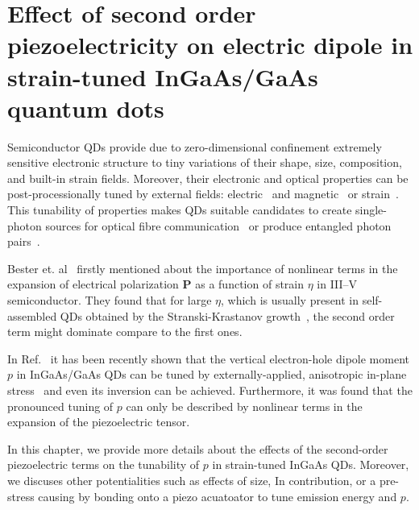 
\chapter{Effect of second order piezoelectricity on electric dipole in strain-tuned InGaAs/GaAs quantum dots}\label{chap:2order_piezo}

Semiconductor QDs provide due to zero-dimensional confinement extremely sensitive electronic structure to tiny variations of their shape, size, composition, and built-in strain fields. %
%
%
Moreover, their electronic and optical properties can be post-processionally tuned by external fields: electric~\cite{Gerardot_2007, Vogel_2007} and magnetic~\cite{Stevenson_2006} or strain~\citep{kleDresden}. This tunability of properties makes QDs suitable candidates to create single-photon sources for optical fibre communication~\cite{Huffaker1998} or produce entangled photon pairs~\cite{Trotta:16}.

Bester et. al~\citep{Bester:06, Bester:06_2} firstly mentioned about the importance of nonlinear terms in the expansion of electrical polarization $\mathbf{P}$ as a function of strain $\eta$ in III--V semiconductor. They found that for large $\eta$, which is usually present in self-assembled QDs obtained by the Stranski-Krastanov growth~\cite{Grundmann}, the second order term might dominate compare to the first ones.

In Ref.~\cite{Aberl:17} it has been recently shown that the vertical electron-hole dipole moment $p$ in InGaAs/GaAs QDs can be tuned by externally-applied, anisotropic in-plane stress~\cite{Trotta:12,Trotta:13} and even its inversion can be achieved. Furthermore, it was found that the pronounced tuning of $p$ can only be described by nonlinear terms in the expansion of the piezoelectric tensor. 

In this chapter, we provide more details about the effects of the second-order piezoelectric terms on the tunability of $p$ in strain-tuned InGaAs QDs. Moreover, we discuses other potentialities such as effects of size, In contribution, or a pre-stress causing by bonding onto a piezo acuatoator to tune emission energy and $p$. 

